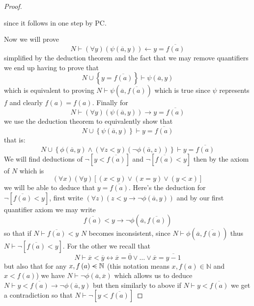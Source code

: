 \begin{proof}
\begin{itemize}
        \) since it follows in one step by PC.
    \end{itemize}
    Now we will prove 
    \[
    N \vdash \left( \forall y \right) \left( \psi \left( \overline{a} ,y \right)
    \right) \leftarrow y =  \overline{f\left( a \right) } 
    \]
    simplified by the deduction theorem and the fact that we may remove
    quantifiers we end up having to prove that 
    \[
    N \cup \left\{ y = \overline{f\left( a \right) }  \right\}  \vdash \psi
    \left( \overline{a}, y  \right) 
    \]
    which is equivalent to proving \( N \vdash \psi \left( \overline{a} ,
    \overline{f\left( a \right) }  \right)  \) which is true since \( \psi  \)
    represents \( f \) and clearly \( f\left( a \right) = f\left( a \right)  \).
    Finally for 
    \[
    N \vdash \left( \forall y \right) \left( \psi \left( \overline{a} ,y \right)
    \right) \rightarrow y =  \overline{f\left( a \right) } 
    \]
    we use the deduction theorem to equivalently show that
    \[
    N \cup \left\{ \psi \left( \overline{a} , y \right)   \right\}  \vdash  y =
    \overline{f\left( a \right) } 
    \]
    that is:
    \[
    N \cup \left\{ \phi \left( \overline{a} , y \right) \land  (\forall
    z<y)(\neg \phi(\overline{a} , z))    \right\}  \vdash  y = \overline{f\left(
    a \right) } 
    \]
    We will find deductions of \( \neg \left[ y < \overline{f\left( a \right) }
    \right]  \) and \( \neg \left[ \overline{f\left( a \right) } < y \right]  \)
    then by the axiom of \( N \) which is 
    \[
    \left( \forall x \right) \left( \forall y \right) \left[ \left( x < y
    \right) \lor \left( x = y \right) \lor \left( y < x \right)  \right] 
    \]
    we will be able to deduce that \( y =  \overline{f\left( a \right) }  \).
    Here's the deduction for \( \neg \left[ \overline{f\left( a \right) } < y
    \right]  \), first write \( \left( \forall z \right) \left( z < y
    \rightarrow \neg \phi \left( \overline{a}, y  \right)  \right)  \) and by our
    first quantifier axiom we may write 
    \[ 
        \overline{f\left( a \right)} < y \rightarrow \neg \phi \left(
        \overline{a} , \overline{f\left( a \right) } \right)  
    \] 
     so that if \( N \vdash \overline{f\left( a \right) } < y \) \( N \) becomes
     inconsistent, since \( N \vdash \phi \left( \overline{a} ,
     \overline{f\left( a \right) }  \right)  \) thus \( N \vdash \neg \left[
     \overline{f\left( a \right) } < y  \right]  \). For the other we recall
     that 
     \[
     N \vdash \overline{x} < \overline{y}  \leftrightarrow \overline{x} =
     \overline{0} \lor \ldots \lor  \overline{x} = \overline{y - 1}  
     \]
     but also that for any \( x , f\left( a \right)  \lin  \mathbb{N}  \) (this
     notation means \( x, f\left( a \right)  \in  \mathbb{N}  \) and \( x <
     f\left( a \right)  \))  we have \( N \vdash \neg \phi \left( \overline{a} ,
     \overline{x}  \right)   \) which allows us to deduce \( N \vdash y <
     \overline{f\left( a \right) } \rightarrow \neg \phi \left( \overline{a} ,y
     \right)  \) but then similarly to above if \( N \vdash y <
     \overline{f\left( a \right) }  \) we get a contradiction so that \( N
     \vdash \neg \left[ y < \overline{f\left( a \right) }  \right]  \) 
\end{proof}
